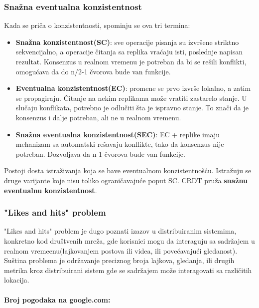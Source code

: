 \documentclass[12pt]{article}
\begin{document}
    \subsubsection{Snažna eventualna konzistentnost}

    Kada se priča o konzistentnosti, spominju se ova tri termina:

    \begin{itemize}
        \item \textbf{Snažna konzistentnost(SC)}: sve operacije pisanja su izvršene striktno sekvencijalno, a operacije čitanja sa replika vraćaju isti, poslednje napisan rezultat. Konsenzus u realnom vremenu je potreban da bi se rešili konflikti, omogućava da do n/2-1 čvorova bude van funkcije.
        \item \textbf{Eventualna konzistentnost(EC)}: promene se prvo izvrše lokalno, a zatim se propagiraju. Čitanje na nekim replikama može vratiti zastarelo stanje. U slučaju konflikata, potrebno je odlučiti šta je ispravno stanje. To znači da je konsenzus i dalje potreban, ali ne u realnom vremenu.
        \item \textbf{Snažna eventualna konzistentnost(SEC)}: EC + replike imaju mehanizam sa automatski rešavaju konflikte, tako da konsenzus nije potreban. Dozvoljava da n-1 čvorova bude van funkcije.
    \end{itemize}

    Postoji dosta istraživanja koja se bave eventualnom konzistentnošću. Istražuju se druge varijante koje nisu toliko ograničavajuće poput SC. CRDT pruža \textbf{snažnu eventualnu konzistentnost}.

    \subsubsection{"Likes and hits" problem}

    "Likes and hits" problem je dugo poznati izazov u distribuiranim sistemima, konkretno kod društvenih mreža, gde korisnici mogu da interaguju sa sadržajem u realnom vremeenu(lajkovanjem postova ili videa, ili povećavajući gledanost). Suština problema je održavanje preciznog broja lajkova, gledanja, ili drugih metrika kroz distribuirani sistem gde se sadržajem može interagovati sa različitih lokacija.

    \paragraph{Broj pogodaka na google.com:}
\end{document}

